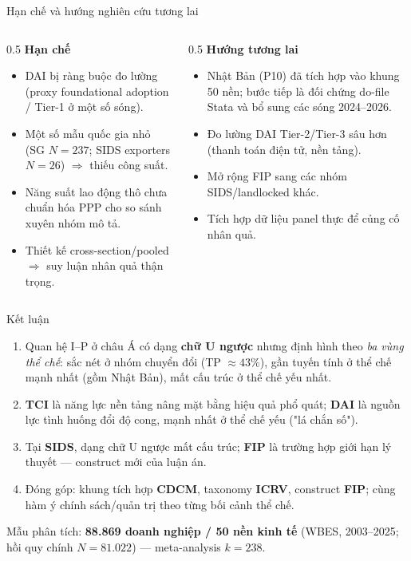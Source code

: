 \documentclass[aspectratio=169,11pt]{beamer}
\newcommand{\hl}[1]{\textcolor{accent2}{\textbf{#1}}}
\newcommand{\kw}[1]{\textcolor{accent}{\textbf{#1}}}
\begin{document}
\begin{frame}{Hạn chế và hướng nghiên cứu tương lai}
  \begin{columns}[T]
    \begin{column}{0.5\textwidth}
      \textbf{Hạn chế}
      \begin{itemize}\small
        \item DAI bị ràng buộc đo lường (proxy foundational adoption / Tier-1 ở một số sóng).
        \item Một số mẫu quốc gia nhỏ (SG $N=237$; SIDS exporters $N=26$) $\Rightarrow$ thiếu công suất.
        \item Năng suất lao động thô chưa chuẩn hóa PPP cho so sánh xuyên nhóm mô tả.
        \item Thiết kế cross-section/pooled $\Rightarrow$ suy luận nhân quả thận trọng.
      \end{itemize}
    \end{column}
    \begin{column}{0.5\textwidth}
      \textbf{Hướng tương lai}
      \begin{itemize}\small
        \item Nhật Bản (P10) đã tích hợp vào khung 50 nền; bước tiếp là đối chứng do-file Stata và bổ sung các sóng 2024--2026.
        \item Đo lường DAI Tier-2/Tier-3 sâu hơn (thanh toán điện tử, nền tảng).
        \item Mở rộng FIP sang các nhóm SIDS/landlocked khác.
        \item Tích hợp dữ liệu panel thực để củng cố nhân quả.
      \end{itemize}
    \end{column}
  \end{columns}
\end{frame}

\begin{frame}{Kết luận}
  \begin{enumerate}
    \item Quan hệ I--P ở châu Á có dạng \hl{chữ U ngược} nhưng định hình theo \emph{ba vùng thể chế}: sắc nét ở nhóm chuyển đổi (TP $\approx 43\%$), gần tuyến tính ở thể chế mạnh nhất (gồm Nhật Bản), mất cấu trúc ở thể chế yếu nhất.
    \item \kw{TCI} là năng lực nền tảng nâng mặt bằng hiệu quả phổ quát; \kw{DAI} là nguồn lực tình huống đổi độ cong, mạnh nhất ở thể chế yếu ("lá chắn số").
    \item Tại \kw{SIDS}, dạng chữ U ngược mất cấu trúc; \hl{FIP} là trường hợp giới hạn lý thuyết --- construct mới của luận án.
    \item Đóng góp: khung tích hợp \kw{CDCM}, taxonomy \kw{ICRV}, construct \kw{FIP}; cùng hàm ý chính sách/quản trị theo từng bối cảnh thể chế.
  \end{enumerate}
  \vspace{0.3em}
  \centering\small Mẫu phân tích: \hl{88.869 doanh nghiệp / 50 nền kinh tế} (WBES, 2003--2025; hồi quy chính $N=81.022$) --- meta-analysis $k=238$.
\end{frame}
\end{document}
